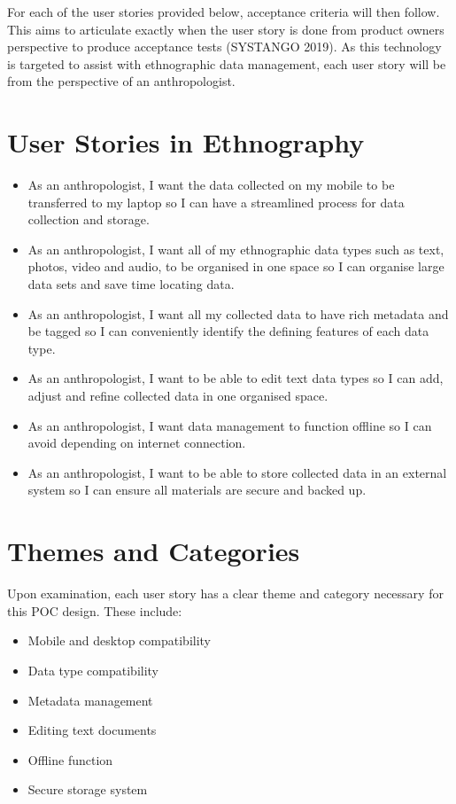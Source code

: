 \documentclass{article}
\begin{document}
For each of the user stories provided below, acceptance criteria will then follow. This aims to articulate exactly when the user story is done from product owners perspective to produce acceptance tests (SYSTANGO 2019). As this technology is targeted to assist with ethnographic data management, each user story will be from the perspective of an anthropologist.
\clearpage



\section{User Stories in Ethnography}    
\begin{itemize}
\item As an anthropologist, I want the data collected on my mobile to be transferred to my laptop so I can have a streamlined process for data collection and storage.
\item As an anthropologist, I want all of my ethnographic data types such as text, photos, video and audio, to be organised in one space so I can organise large data sets and save time locating data.
\item As an anthropologist, I want all my collected data to have rich metadata and be tagged so I can conveniently identify the defining features of each data type. 
\item As an anthropologist, I want to be able to edit text data types so I can add, adjust and refine collected data in one organised space.
\item As an anthropologist, I want data management to function offline so I can avoid depending on internet connection.
\item As an anthropologist, I want to be able to store collected data in an external system so I can ensure all materials are secure and backed up.  
\end{itemize}

\section{Themes and Categories}
Upon examination, each user story has a clear theme and category necessary for this POC design. These include:
\begin{itemize}
    \item Mobile and desktop compatibility
    \item Data type compatibility
    \item Metadata management
    \item Editing text documents
    \item Offline function
    \item Secure storage system
\end{itemize}
\end{document}
